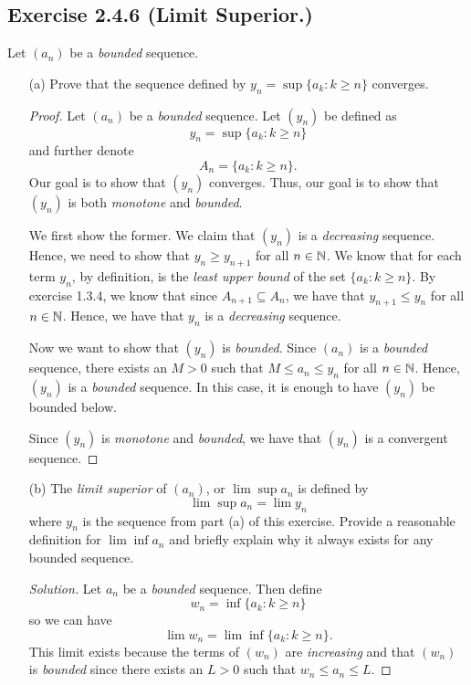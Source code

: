 \subsection{Exercise 2.4.6 (Limit Superior.) }
Let \( (a_n)\) be a \textit{bounded} sequence. 
\begin{enumerate}
    \item[(a)] Prove that the sequence defined by \( y_n = \sup \{ a_k : k \geq n \}\) converges. 
        \begin{proof}
        Let \( (a_n)\) be a \textit{bounded} sequence. Let \( (y_n)\) be defined as 
        \[ y_n = \sup \{ a_k : k \geq n \}\] and further denote
        \[ A_n = \{ a_k : k \geq n\}.\]
        Our goal is to show that \( (y_n)\) converges. Thus, our goal is to show that \( (y_n)\) is both \textit{monotone} and \textit{bounded}.

        We first show the former. We claim that \( (y_n)\) is a \textit{decreasing} sequence. Hence, we need to show that \( y_n \geq y_{n+1}\) for all \( n \in \mathbb{N} \). We know that for each term \( y_n \), by definition, is the \textit{least upper bound} of the set \( \{a_k: k \geq n\}\). By exercise 1.3.4, we know that since \( A_{n+1} \subseteq A_n \), we have that \( y_{n+1} \leq y_n\) for all \( n \in \mathbb{N} \). Hence, we have that \( y_n\) is a \textit{decreasing} sequence.

        Now we want to show that \( (y_n)\) is \textit{bounded}. Since \( (a_n)\) is a \textit{bounded} sequence, there exists an \( M > 0 \) such that \( M \leq a_n \leq y_n  \) for all \( n \in \mathbb{N} \). Hence, \( (y_n)\) is a \textit{bounded} sequence. In this case, it is enough to have \( (y_n)\) be bounded below.

        Since \( (y_n)\) is \textit{monotone} and \textit{bounded}, we have that \( (y_n)\) is a convergent sequence.

        \end{proof}
    \item[(b)] The \textit{limit superior} of \( (a_n)\), or \( \lim \sup a_n   \) is defined by 
        \[ \lim  \sup a_n = \lim y_n   \] where \( y_n \) is the sequence from part (a) of this exercise. Provide a reasonable definition for \( \lim \inf a_n  \) and briefly explain why it always exists for any bounded sequence.
      \begin{proof}[Solution]
       Let \( a_n \) be a \textit{bounded} sequence. Then define   
       \[ w_n = \inf \{ a_k : k \geq n  \}\]
       so we can have 
       \[ \lim w_n = \lim \inf\{a_k : k \geq n\}. \]
      This limit exists because the terms of \( (w_n) \) are \textit{increasing} and that \( (w_n) \) is \textit{bounded} since there exists an \( L > 0 \) such that \( w_n \leq a_n \leq L \).



\end{proof}
\end{enumerate}
